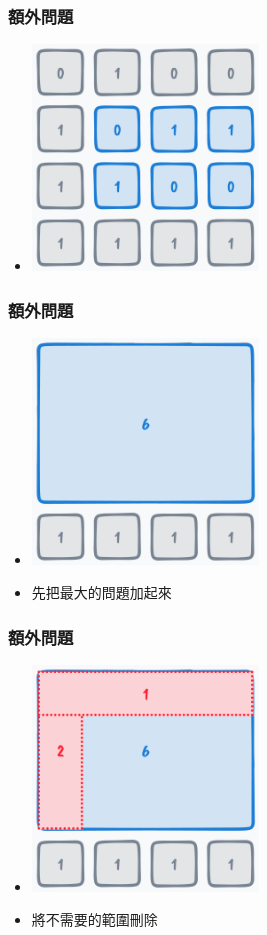 \documentclass{beamer}
\begin{document}
\begin{frame}
    \frametitle{額外問題}
    \begin{itemize}
        \item \includegraphics[width=6.0cm]{img/img_11.png}
    \end{itemize}
\end{frame}

\begin{frame}
    \frametitle{額外問題}
    \begin{itemize}
        \item \includegraphics[width=6.0cm]{img/img_12.png}
        \item 先把最大的問題加起來
    \end{itemize}
\end{frame}

\begin{frame}
    \frametitle{額外問題}
    \begin{itemize}
        \item \includegraphics[width=6.0cm]{img/img_13.png}
        \item 將不需要的範圍刪除
    \end{itemize}
\end{frame}
\end{document}
